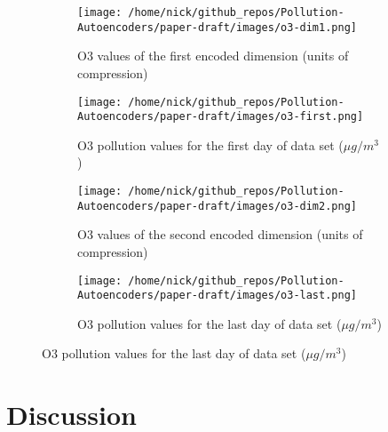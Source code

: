\documentclass{article}
\begin{document}
\begin{figure}[h!]
    \caption{Geographic comparison of model embedding values versus daily pollution levels}
    \label{fig:outliers_vs_dense_cities}
\begin{subfigure}{0.5\textwidth}
    \centering
    \texttt{[image: /home/nick/github\_repos/Pollution-Autoencoders/paper-draft/images/o3-dim1.png]} 
    \caption{O3 values of the first encoded dimension (units of compression)}
    \label{fig:outliers}
\end{subfigure}
\begin{subfigure}{0.5\textwidth}
    \centering
    \texttt{[image: /home/nick/github\_repos/Pollution-Autoencoders/paper-draft/images/o3-first.png]}
    \caption{O3 pollution values for the first day of data set ($\mu g/m^3$)}
    \label{fig:dense_cities}
\end{subfigure}
\begin{subfigure}{0.5\textwidth}
    \centering
    \texttt{[image: /home/nick/github\_repos/Pollution-Autoencoders/paper-draft/images/o3-dim2.png]} 
    \caption{O3 values of the second encoded dimension (units of compression)}
    \label{fig:outliers}
\end{subfigure}
\begin{subfigure}{0.5\textwidth}
    \centering
    \texttt{[image: /home/nick/github\_repos/Pollution-Autoencoders/paper-draft/images/o3-last.png]}
    \caption{O3 pollution values for the last day of data set ($\mu g/m^3$)}
    \label{fig:dense_cities}
\end{subfigure}
\end{figure}

\newpage

\section{Discussion}
\end{document}
